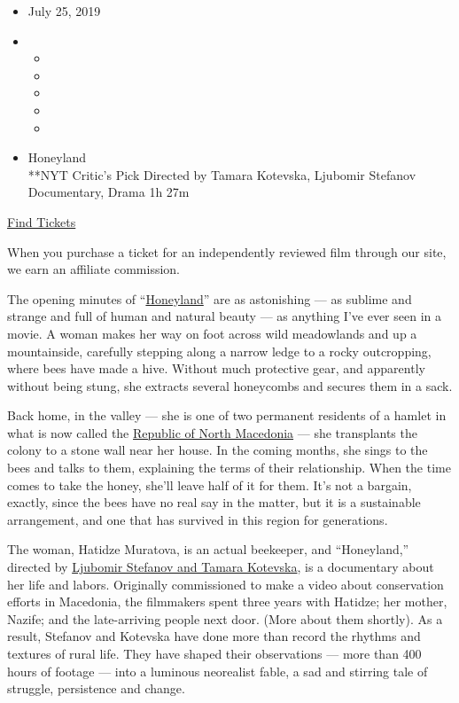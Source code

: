 \begin{itemize}
\item
  July 25, 2019
\item
  \begin{itemize}
  \item
  \item
  \item
  \item
  \item
  \end{itemize}
\end{itemize}

\begin{itemize}
\tightlist
\item
  Honeyland\\
  **NYT Critic's Pick Directed by Tamara Kotevska, Ljubomir Stefanov
  Documentary, Drama 1h 27m
\end{itemize}

\href{https://www.imdb.com/showtimes/title/tt8991268?ref_=ref_ext_NYT}{Find
Tickets}

When you purchase a ticket for an independently reviewed film through
our site, we earn an affiliate commission.

The opening minutes of ``\href{https://honeyland.earth/}{Honeyland}''
are as astonishing --- as sublime and strange and full of human and
natural beauty --- as anything I've ever seen in a movie. A woman makes
her way on foot across wild meadowlands and up a mountainside, carefully
stepping along a narrow ledge to a rocky outcropping, where bees have
made a hive. Without much protective gear, and apparently without being
stung, she extracts several honeycombs and secures them in a sack.

Back home, in the valley --- she is one of two permanent residents of a
hamlet in what is now called the
\href{https://www.nytimes.com/2019/05/17/travel/republic-of-north-macedonia-balkans.html}{Republic
of North Macedonia} --- she transplants the colony to a stone wall near
her house. In the coming months, she sings to the bees and talks to
them, explaining the terms of their relationship. When the time comes to
take the honey, she'll leave half of it for them. It's not a bargain,
exactly, since the bees have no real say in the matter, but it is a
sustainable arrangement, and one that has survived in this region for
generations.

The woman, Hatidze Muratova, is an actual beekeeper, and ``Honeyland,''
directed by \href{https://www.youtube.com/watch?v=_ES4mfYYsII}{Ljubomir
Stefanov and Tamara Kotevska}, is a documentary about her life and
labors. Originally commissioned to make a video about conservation
efforts in Macedonia, the filmmakers spent three years with Hatidze; her
mother, Nazife; and the late-arriving people next door. (More about them
shortly). As a result, Stefanov and Kotevska have done more than record
the rhythms and textures of rural life. They have shaped their
observations --- more than 400 hours of footage --- into a luminous
neorealist fable, a sad and stirring tale of struggle, persistence and
change.

